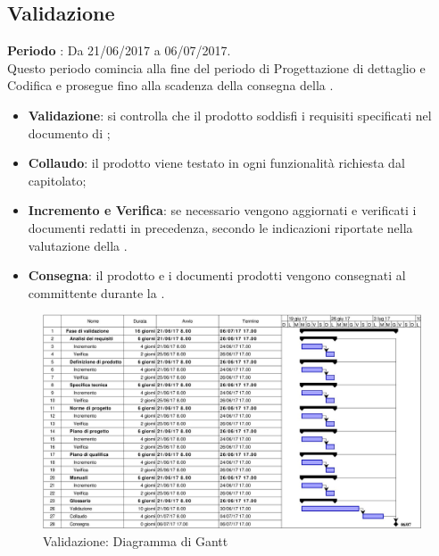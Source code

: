 \documentclass[../PianoDiProgetto.tex]{subfiles}
\begin{document}
		\subsection{Validazione}
		\textbf{Periodo} : Da 21/06/2017 a 06/07/2017. \\
		Questo periodo comincia alla fine del periodo di Progettazione di dettaglio e Codifica e prosegue fino alla scadenza della consegna della \revisionediaccettazione.
		\begin{itemize}
			\item \textbf{Validazione}: si controlla che il prodotto soddisfi i requisiti specificati nel documento di \analisideirequisiti ;
			\item \textbf{Collaudo}: il prodotto viene testato in ogni funzionalità richiesta dal capitolato;
			\item \textbf{Incremento e Verifica}:  se necessario vengono aggiornati e verificati i documenti redatti in precedenza, secondo le indicazioni riportate nella valutazione della \revisionediqualifica.
			\item \textbf{Consegna}: il prodotto e i documenti prodotti vengono consegnati al committente durante la \revisionediaccettazione.
		\end{itemize}
		\begin{figure}[H]
			\centering
			\includegraphics[scale=0.55]{Figures/Gantt_Validazione.jpg}
			\caption{Validazione: Diagramma di Gantt}
		\end{figure}
			
\end{document}
